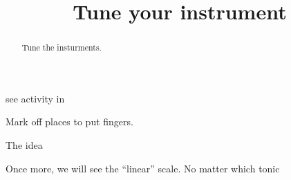 \documentclass[12pt,noauthor,nooutcomes]{ximera}
\author{}
\title{Tune your instrument}
\begin{document}
\begin{abstract}
  Tune the insturments.
\end{abstract}
\maketitle

see activity in \cite{rG2016}


Mark off places to put fingers.

\begin{question}
    The idea 
\end{question}




\begin{question}
Once more, we will see the ``linear'' scale. No matter which tonic
\end{question}



\begin{question}
    
\end{question}




\begin{question}
\end{question}



\begin{question}




\end{question}
\end{document}
